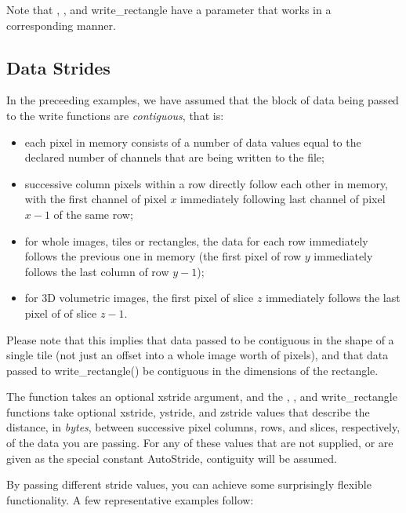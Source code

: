 \noindent Note that \writescanline, \writetile, and {\cf
  write_rectangle} have a parameter that works in a corresponding
manner.


\subsection{Data Strides}
\label{sec:imageoutput:strides}

In the preceeding examples, we have assumed that the block of data being
passed to the {\cf write} functions are \emph{contiguous}, that is:

\begin{itemize}
\item each pixel in memory consists of a number of data values equal to
  the declared number of channels that are being written to the file;
\item successive column pixels within a row directly follow each other in
  memory, with the first channel of pixel $x$ immediately following
  last channel of pixel $x-1$ of the same row;
\item for whole images, tiles or rectangles, the data for each row
  immediately follows the previous one in memory (the first pixel of row
  $y$ immediately follows the last column of row $y-1$);
\item for 3D volumetric images, the first pixel of slice $z$ immediately
  follows the last pixel of of slice $z-1$.
\end{itemize}

Please note that this implies that data passed to
\writetile be contiguous in the shape of a single tile (not just an
offset into a whole image worth of pixels), and that data passed to {\cf
  write_rectangle()} be contiguous in the dimensions of the rectangle.

The \writescanline function takes an optional {\cf xstride} argument,
and the \writeimage, \writetile, and {\cf write_rectangle} functions
take optional {\cf xstride}, {\cf ystride}, and {\cf zstride} values
that describe the distance, in \emph{bytes}, between successive pixel
columns, rows, and slices, respectively, of the data you are passing.
For any of these values that are not supplied, or are given as the
special constant {\cf AutoStride}, contiguity will be assumed.

By passing different stride values, you can achieve some surprisingly
flexible functionality.  A few representative examples follow:

